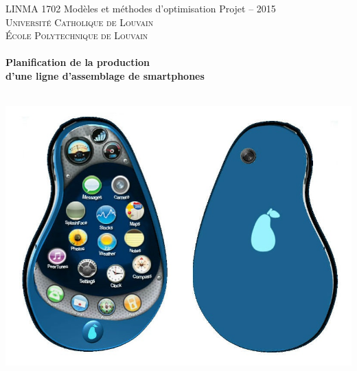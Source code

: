 
\begin{titlepage}
      \center
      
      LINMA 1702 Mod\`{e}les et m\'{e}thodes d'optimisation \hfill Projet -- 2015\\ 
      \vspace{0.7cm}
      {\LARGE \textsc{Universit\'e Catholique de Louvain}}\\
      {\large \textsc{\'Ecole Polytechnique de Louvain}}\\

      
      \vspace{0.7cm}
      \hrulefill
      \\
      \vspace{0.7cm}
      {\huge \textbf{Planification de la production}} \\ 
      \vspace{0.7cm}
      {\huge \textbf{d'une ligne d'assemblage de smartphones}} \\
      \vspace{0.5cm}
      \hrulefill
      \\
      \vspace{0.3cm}
      
  \begin{center}
      \includegraphics*[height=0.4\textheight]{img/cover_photo.jpg}
      \end{center}      
      
      \vspace{0.2cm}      
      

\end{titlepage}
